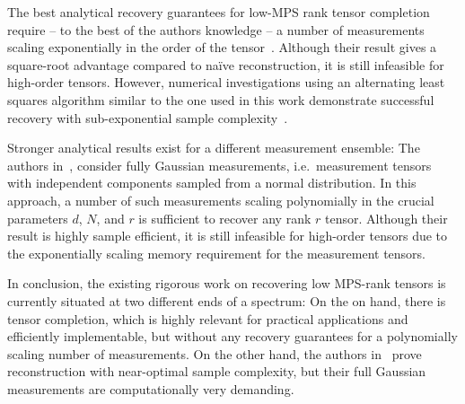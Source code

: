 The best analytical recovery guarantees for low-MPS rank tensor completion require -- to the best of the authors knowledge -- a number of measurements scaling exponentially in the order of the tensor~\cite{Phien_2016_Efficient}.
Although their result gives a square-root advantage compared to na\"ive reconstruction, it is still infeasible for high-order tensors.
However, numerical investigations using an alternating least squares algorithm similar to the one used in this work demonstrate successful recovery with sub-exponential sample complexity~\cite{Grasedyck_2015_Variants,Wang_2016_Tensor}.


Stronger analytical results exist for a different measurement ensemble:
The authors in~\cite{Rauhut_2014_Tensor}, consider fully Gaussian measurements, i.e.\ measurement tensors with independent components sampled from a normal distribution.
In this approach, a number of such measurements scaling polynomially in the crucial parameters $d$, $N$, and $r$ is sufficient to recover any rank $r$ tensor.
Although their result is highly sample efficient, it is still infeasible for high-order tensors due to the exponentially scaling memory requirement for the measurement tensors.

In conclusion, the existing rigorous work on recovering low MPS-rank tensors is currently situated at two different ends of a spectrum:
On the on hand, there is tensor completion, which is highly relevant for practical applications and efficiently implementable, but without any recovery guarantees for a polynomially scaling number of measurements.
On the other hand, the authors in~\cite{Rauhut_2014_Tensor} prove reconstruction with near-optimal sample complexity, but their full Gaussian measurements are computationally very demanding.

